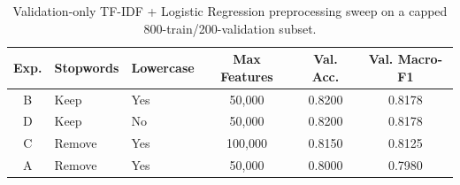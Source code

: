 \begin{table}[H]
\centering
\small
\begin{tabular}{cllccc}
\toprule
Exp. & Stopwords & Lowercase & Max Features & Val. Acc. & Val. Macro-F1 \\
\midrule
B & Keep & Yes & 50{,}000 & 0.8200 & 0.8178 \\
D & Keep & No & 50{,}000 & 0.8200 & 0.8178 \\
C & Remove & Yes & 100{,}000 & 0.8150 & 0.8125 \\
A & Remove & Yes & 50{,}000 & 0.8000 & 0.7980 \\
\bottomrule
\end{tabular}
\caption{Validation-only TF-IDF + Logistic Regression preprocessing sweep on a capped 800-train/200-validation subset.}
\label{tab:q1_preprocessing_results}
\end{table}